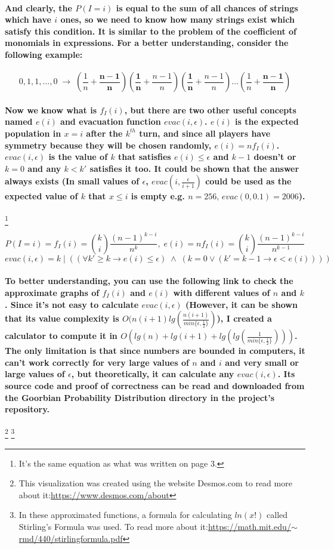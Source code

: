 \documentclass[oneside]{book}
\newcommand{\myparagraph}[1]{\paragraph{\textnormal{#1}}}
\begin{document}
\myparagraph{
And clearly, the $P(I = i)$ is equal to the sum of all chances of strings which have $i$ ones, so we need to know how many strings exist which satisfy this condition. It is similar to the problem of the coefficient of monomials in expressions. For a better understanding, consider the following example:
}

$$0, 1, 1, ..., 0 \; \rightarrow \; (\frac{1}{n} + \mathbf{\frac{n-1}{n}})(\mathbf{\frac{1}{n}} + \frac{n-1}{n})(\mathbf{\frac{1}{n}} + \frac{n-1}{n})...(\frac{1}{n} + \mathbf{\frac{n-1}{n}})$$

\myparagraph{
Now we know what is $f_I(i)$, but there are two other useful concepts named $e(i)$ and evacuation function $evac(i, \epsilon)$. $e(i)$ is the expected population in $x = i$ after the $k^{th}$ turn, and since all players have symmetry because they will be chosen randomly, $e(i) = n f_I(i)$. $evac(i, \epsilon)$ is the value of $k$ that satisfies $e(i) \le \epsilon$ and $k-1$ doesn't or $k = 0$ and any $k < k'$ satisfies it too. It could be shown that the answer always exists (In small values of $\epsilon$, $evac(i, \frac{\epsilon}{i+1})$ could be used as the expected value of $k$ that $x \le i$ is empty e.g. $n = 256, \, evac(0, 0.1) = 2006$).
}
\footnote{It's the same equation as what was written on page 3.}

$$P(I=i) = f_I(i) = \binom{k}{i} \frac{(n-1)^{k - i}}{n^k}, \; e(i) = n f_I(i) = \binom{k}{i} \frac{(n-1)^{k - i}}{n^{k - 1}}$$
$$evac(i, \epsilon) = k \; | \; ((\forall k' \ge k \rightarrow e(i) \le \epsilon) \; \land \; (k = 0 \lor ( k' = k - 1 \rightarrow \epsilon < e(i) ) ))$$

\myparagraph{
To better understanding, you can use the following link to check the approximate graphs of $f_I(i)$ and $e(i)$ with different values of $n$ and $k$. Since it's not easy to calculate $evac(i, \epsilon)$ (However, it can be shown that its value complexity is $O(n(i + 1)lg(\frac{n(i+1)}{min\{\epsilon,\frac{1}{2}\}})$), I created a calculator to compute it in $O(lg(n)+lg(i+1)+lg(lg(\frac{1}{min\{\epsilon,\frac{1}{2}\}})))$. The only limitation is that since numbers are bounded in computers, it can't work correctly for very large values of $n$ and $i$ and very small or large values of $\epsilon$, but theoretically, it can calculate any $evac(i, \epsilon)$. Its source code and proof of correctness can be read and downloaded from the \textbf{Goorbian Probability Distribution} directory in the project's repository.
}
\footnote{This visualization was created using the website Desmos.com to read more about it:\newline \href{https://www.desmos.com/about}{https://www.desmos.com/about}}
\footnote{In these approximated functions, a formula for calculating $ln(x!)$ called Stirling's Formula was used. To read more about it:\newline \href{https://math.mit.edu/~rmd/440/stirlingformula.pdf}{https://math.mit.edu/$\sim$rmd/440/stirlingformula.pdf}}
\end{document}
